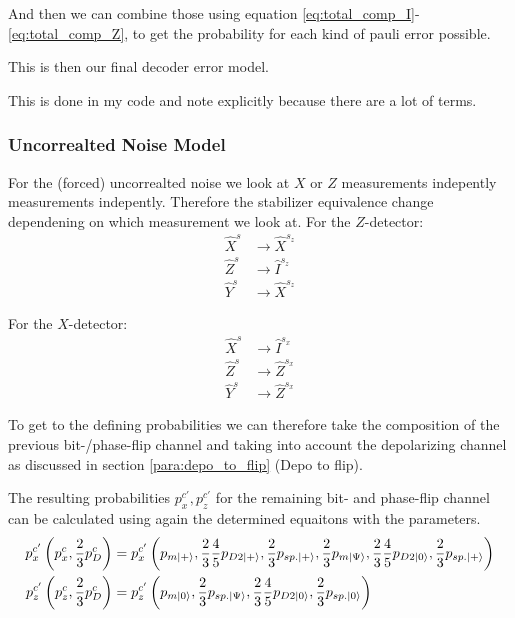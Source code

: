 And then we can combine those using equation \ref{eq:total_comp_I}-\ref{eq:total_comp_Z},
to get the probability for each kind of pauli error possible.

This is then our final decoder error model.

This is done in my code and note explicitly because there are a lot of terms.

\subsubsection{Uncorrealted Noise Model}

For the (forced) uncorrealted noise we look at $X$ or $Z$ measurements indepently measurements indepently.
Therefore the stabilizer equivalence change dependening on which measurement we look at.
For the $Z$-detector:
\begin{align}
    \hat{X}^s  &\rightarrow \hat{X}^{s_z} \\
    \hat{Z}^s  &\rightarrow \hat{I}^{s_z} \\
    \hat{Y}^s  &\rightarrow \hat{X}^{s_z}
\end{align}

For the $X$-detector:
\begin{align}
    \hat{X}^s  &\rightarrow \hat{I}^{s_x} \\
    \hat{Z}^s  &\rightarrow \hat{Z}^{s_x} \\
    \hat{Y}^s  &\rightarrow \hat{Z}^{s_x}
\end{align}

To get to the defining probabilities we can therefore take the composition of the previous bit-/phase-flip channel 
and taking into account the depolarizing channel as discussed in section \ref{para:depo_to_flip} (Depo to flip). 

The resulting probabilities $p_{x}^{c'}, p_{z}^{c'}$ for the remaining bit- and phase-flip channel can be calculated using again the determined equaitons with the parameters. 
\begin{align}
    p^{c'}_x \left(p^{c}_x, \frac{2}{3}p^{c}_D\right) &=p^{c'}_x \left(p_{m\ket{+}}, \frac{2}{3}\frac{4}{5}p_{D2\ket{+}},\frac{2}{3}p_{sp.\ket{+}}, \frac{2}{3}p_{m\ket{\Psi}}, \frac{2}{3}\frac{4}{5}p_{D2\ket{0}},\frac{2}{3}p_{sp.\ket{+}}\right) \\
    p^{c'}_z \left(p^{c}_z, \frac{2}{3}p^{c}_D\right) &=p^{c'}_z \left(p_{m\ket{0}},\frac{2}{3}p_{sp.\ket{\Psi}}, \frac{2}{3}\frac{4}{5}p_{D2\ket{0}},\frac{2}{3}p_{sp.\ket{0}} \right)   
\end{align}

